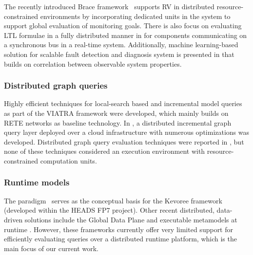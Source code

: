 The recently introduced Brace framework~\cite{Zheng2016} supports RV in distributed resource-constrained environments by incorporating dedicated units in the system to support global evaluation of monitoring goals. There is also focus on evaluating LTL formulae in a fully distributed manner in \cite{Bauer2016} for components communicating on a synchronous bus in a real-time system.
Additionally, machine learning-based solution for scalable fault detection and diagnosis system is presented in \cite{Alippi2017} that builds on correlation between observable system properties.

\subsubsection{Distributed graph queries}
Highly efficient techniques for local-search based \cite{icgt2015} and incremental model queries \cite{scp2015} as part of the VIATRA framework were developed, which mainly builds on RETE networks as baseline technology. In \cite{models2014-iqd}, a distributed incremental graph query layer deployed over a cloud infrastructure with numerous optimizations was developed. 
Distributed graph query evaluation techniques were reported in \cite{Mitschke2014,Peters2014,Krause2014}, but none of these techniques considered an execution environment with resource-constrained computation units.

\subsubsection{Runtime models} 
The \mrt paradigm~\cite{DBLP:journals/computer/BlairBF09} serves as the conceptual basis for the Kevoree framework~\cite{Morin2014} (developed within the HEADS FP7 project). Other recent distributed, data-driven solutions include the Global Data Plane \cite{Zhang2015} and executable metamodels at runtime \cite{Vogel2014}. However, these frameworks currently offer very limited support for efficiently evaluating queries over a distributed runtime platform, which is the main focus of our current work.







